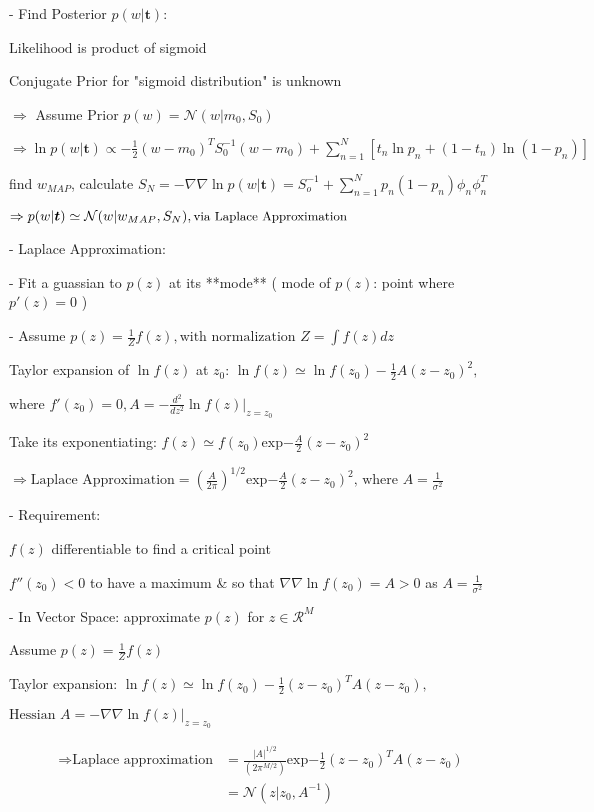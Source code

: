 - Find Posterior $p(w|\boldsymbol{t})$: 

$\text{Likelihood}$ is product of sigmoid

Conjugate $\text{Prior}$ for "sigmoid distribution" is unknown

$\Rightarrow$ Assume $\text{Prior } p(w) = \mathcal{N}(w|m_0, S_0)$ 

$\Rightarrow \displaystyle \ln p(w|\boldsymbol{t}) \propto -\frac 1 2 (w-m_0)^TS_0^{-1}(w-m_0) + \sum_{n=1}^N[t_n\ln p_n + (1-t_n) \ln(1-p_n) ]$ 

	find $w_{MAP}$, calculate $\displaystyle S_N = -\nabla \nabla \ln p(w|\boldsymbol{t}) = S_o^{-1} + \sum_{n=1}^N p_n(1-p_n)\phi_n\phi_n^T$ 

$\Rightarrow p(w|\boldsymbol{t}) \simeq \mathcal{N}(w|w_{MAP}, S_N), \small \text{via Laplace Approximation}$ 

- Laplace Approximation: 

- Fit a guassian to $p(z)$ at its **mode** ( mode of $p(z)$: point where $p'(z)=0$ )

- Assume $p(z) = \frac 1 Z f(z), \text{with normalization } Z = \int f(z)dz$ 

Taylor expansion of $\ln f(z)$ at $z_0$: $\ln f(z) \simeq \ln f(z_0)-\frac 1 2A(z-z_0)^2,$ 

	$\text{where } f'(z_0)=0, A=- \frac {d^2}{dz^2}\ln f(z) |_{z=z_0}$ 

Take its exponentiating: $f(z) \simeq f(z_0)\text{exp{$-\frac A 2 (z-z_0)^2$}}$ 

$\displaystyle \Rightarrow \text{Laplace Approximation} = (\frac A {2\pi})^{1/2} \text{exp{$-\frac A 2 (z-z_0)^2$}} \text{, where }A=\frac 1 {\sigma^2}$ 

- Requirement:

	$f(z)$ differentiable to find a critical point

	$f''(z_0) < 0$ to have a maximum \& so that $\nabla \nabla\ln f(z_0)=A>0$ as $A=\frac1 {\sigma^2}$ 

- In Vector Space: approximate $p(z)$ for $z\in \mathcal{R}^M$ 

Assume $p(z)=\frac 1 Z f(z)$

Taylor expansion: $\ln f(z) \simeq \ln f(z_0) - \frac 1 2 (z-z_0)^TA(z-z_0),$ 

	$\text{Hessian } A = - \nabla \nabla \ln f(z)|_{z=z_0} $ 

\begin{align}  \Rightarrow \text{Laplace approximation}&= \frac {|A|^{1/2}}{(2\pi^{M/2})}\text{exp{$-\frac 1 2 (z-z_0)^TA(z-z_0)$}} \\ &= \mathcal{N}(z|z_0, A^{-1}) \end{align}

